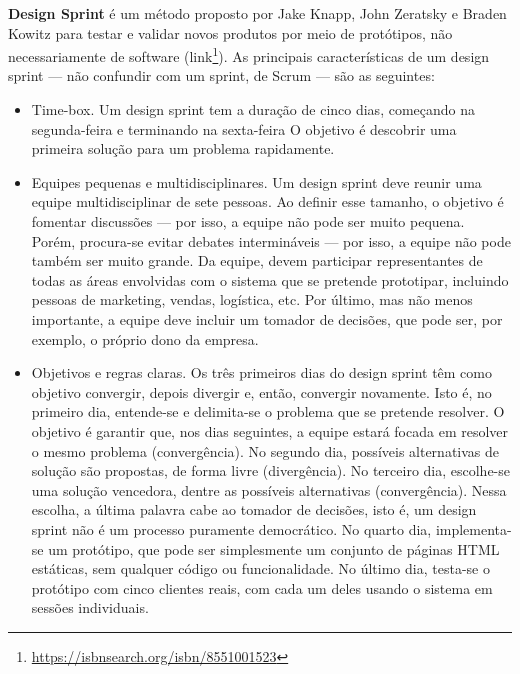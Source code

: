 \documentclass[
  11pt,
  twoside]{book}
\DeclareRobustCommand{\href}[2]{#2\footnote{\url{#1}}}
\begin{document}
 

\textbf{Design Sprint} é um método proposto por Jake Knapp, John
Zeratsky e Braden Kowitz para testar e validar novos produtos por meio
de protótipos, não necessariamente de software
(\href{https://isbnsearch.org/isbn/8551001523}{link}). As principais
características de um design sprint --- não confundir com um sprint, de
Scrum --- são as seguintes:

\begin{itemize}
\item
  Time-box. Um design sprint tem a duração de cinco dias, começando na
  segunda-feira e terminando na sexta-feira O objetivo é descobrir uma
  primeira solução para um problema rapidamente.
\item
  Equipes pequenas e multidisciplinares. Um design sprint deve reunir
  uma equipe multidisciplinar de sete pessoas. Ao definir esse tamanho,
  o objetivo é fomentar discussões --- por isso, a equipe não pode ser
  muito pequena. Porém, procura-se evitar debates intermináveis --- por
  isso, a equipe não pode também ser muito grande. Da equipe, devem
  participar representantes de todas as áreas envolvidas com o sistema
  que se pretende prototipar, incluindo pessoas de marketing, vendas,
  logística, etc. Por último, mas não menos importante, a equipe deve
  incluir um tomador de decisões, que pode ser, por exemplo, o próprio
  dono da empresa.
\item
  Objetivos e regras claras. Os três primeiros dias do design sprint têm
  como objetivo convergir, depois divergir e, então, convergir
  novamente. Isto é, no primeiro dia, entende-se e delimita-se o
  problema que se pretende resolver. O objetivo é garantir que, nos dias
  seguintes, a equipe estará focada em resolver o mesmo problema
  (convergência). No segundo dia, possíveis alternativas de solução são
  propostas, de forma livre (divergência). No terceiro dia, escolhe-se
  uma solução vencedora, dentre as possíveis alternativas
  (convergência). Nessa escolha, a última palavra cabe ao tomador de
  decisões, isto é, um design sprint não é um processo puramente
  democrático. No quarto dia, implementa-se um protótipo, que pode ser
  simplesmente um conjunto de páginas HTML estáticas, sem qualquer
  código ou funcionalidade. No último dia, testa-se o protótipo com
  cinco clientes reais, com cada um deles usando o sistema em sessões
  individuais.
\end{itemize}
\end{document}
